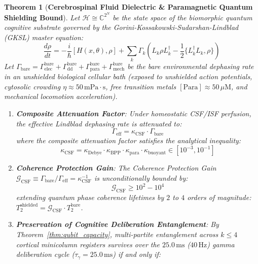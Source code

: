 \documentclass[10pt,twocolumn,3p]{article}
\newtheorem{theorem}{Theorem}
\begin{document}
\begin{theorem}[\textbf{Cerebrospinal Fluid Dielectric \& Paramagnetic Quantum Shielding Bound}]
\label{thm:csf_shielding}
Let $\mathcal{H} \cong \mathbb{C}^{2^N}$ be the state space of the biomorphic quantum cognitive substrate governed by the Gorini-Kossakowski-Sudarshan-Lindblad (GKSL) master equation:
\begin{equation}
    \frac{d\rho}{dt} = -\frac{i}{\hbar}[H(x, \theta), \rho] + \sum_k \Gamma_k \left( L_k \rho L_k^\dagger - \frac{1}{2}\{L_k^\dagger L_k, \rho\} \right)
\end{equation}
Let $\Gamma_{\text{bare}} = \Gamma_{\text{elec}}^{\text{bare}} + \Gamma_{\text{dd}}^{\text{bare}} + \Gamma_{\text{para}}^{\text{bare}} + \Gamma_{\text{mech}}^{\text{bare}}$ be the bare environmental dephasing rate in an unshielded biological cellular bath (exposed to unshielded action potentials, cytosolic crowding $\eta \approx 50\,\text{mPa}\cdot\text{s}$, free transition metals $[\text{Para}] \approx 50\,\mu\text{M}$, and mechanical locomotion acceleration).
\begin{enumerate}
    \item \textbf{Composite Attenuation Factor}: Under homeostatic CSF/ISF perfusion, the effective Lindblad dephasing rate is attenuated to:
    \begin{equation}
        \Gamma_{\text{eff}} = \kappa_{\text{CSF}} \cdot \Gamma_{\text{bare}}
    \end{equation}
    where the composite attenuation factor satisfies the analytical inequality:
    \begin{equation}
        \boxed{\kappa_{\text{CSF}} = \kappa_{\text{Debye}} \cdot \kappa_{\text{BPP}} \cdot \kappa_{\text{para}} \cdot \kappa_{\text{buoyant}} \in [10^{-3}, 10^{-1}]}
        \label{eq:kappa_bound}
    \end{equation}
    \item \textbf{Coherence Protection Gain}: The Coherence Protection Gain $\mathcal{G}_{\text{CSF}} \equiv \Gamma_{\text{bare}} / \Gamma_{\text{eff}} = \kappa_{\text{CSF}}^{-1}$ is unconditionally bounded by:
    \begin{equation}
        \boxed{\mathcal{G}_{\text{CSF}} \ge 10^2 - 10^4}
        \label{eq:gain_bound}
    \end{equation}
    extending quantum phase coherence lifetimes by $2$ to $4$ orders of magnitude: $T_2^{\text{shielded}} = \mathcal{G}_{\text{CSF}} \cdot T_2^{\text{bare}}$.
    \item \textbf{Preservation of Cognitive Deliberation Entanglement}: By Theorem~\ref{thm:qubit_capacity}, multi-partite entanglement across $k \le 4$ cortical minicolumn registers survives over the $25.0\,\text{ms}$ ($40\,\text{Hz}$) gamma deliberation cycle ($\tau_\gamma = 25.0\,\text{ms}$) if and only if:

\end{enumerate}
\end{theorem}
\end{document}
